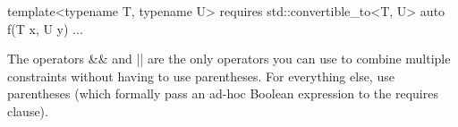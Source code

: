 \begin{cpp}
template<typename T, typename U>
requires std::convertible_to<T, U>
auto f(T x, U y) {
	...
}
\end{cpp}

The operators \&\& and || are the only operators you can use to combine multiple constraints without having to use parentheses. For everything else, use parentheses (which formally pass an ad-hoc Boolean expression to the requires clause).































